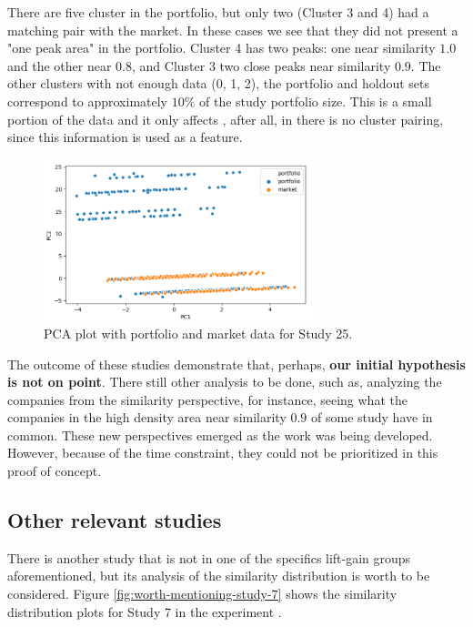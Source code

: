 There are five cluster in the portfolio, but only two (Cluster 3 and 4) had a matching pair with the market. In these cases we see that they did not present a "one peak area" in the portfolio. Cluster 4 has two peaks: one near similarity $1.0$ and the other near $0.8$, and Cluster 3 two close peaks near similarity $0.9$. The other clusters with not enough data (0, 1, 2), the portfolio and holdout sets correspond to approximately $10\%$ of the study portfolio size. This is a small portion of the data and it only affects \nameExperimentI{}, after all, in \nameExperimentII{} there is no cluster pairing, since this information is used as a feature.

\begin{figure}[!ht]
   \centering
   \includegraphics[width=8cm]{fig/ch4-study-25-pca.png}
   \caption{PCA plot with portfolio and market data for Study 25.}
   \label{fig:study-25-pca}
\end{figure}

The outcome of these studies demonstrate that, perhaps, \textbf{our initial hypothesis is not on point}. There still other analysis to be done, such as, analyzing the companies from the similarity perspective, for instance, seeing what the companies in the high density area near similarity $0.9$ of some study have in common. These new perspectives emerged as the work was being developed. However, because of the time constraint, they could not be prioritized in this proof of concept. 

\subsection{Other relevant studies}
\label{ch:worth-ment}

There is another study that is not in one of the specifics lift-gain groups aforementioned, but its analysis of the similarity distribution is worth to be considered. Figure \ref{fig:worth-mentioning-study-7} shows the similarity distribution plots for Study 7 in the experiment \nameExperimentII{}. 

